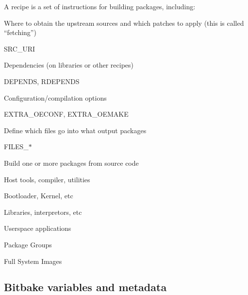 \begin{DoxyItemize}
\item A recipe is a set of instructions for building packages, including\+:
\begin{DoxyItemize}
\item Where to obtain the upstream sources and which patches to apply (this is called “fetching”)
\begin{DoxyItemize}
\item S\+R\+C\+\_\+\+U\+RI
\end{DoxyItemize}
\item Dependencies (on libraries or other recipes)
\begin{DoxyItemize}
\item D\+E\+P\+E\+N\+DS, R\+D\+E\+P\+E\+N\+DS
\end{DoxyItemize}
\item Configuration/compilation options
\begin{DoxyItemize}
\item E\+X\+T\+R\+A\+\_\+\+O\+E\+C\+O\+NF, E\+X\+T\+R\+A\+\_\+\+O\+E\+M\+A\+KE
\end{DoxyItemize}
\item Define which files go into what output packages
\begin{DoxyItemize}
\item F\+I\+L\+E\+S\+\_\+$\ast$
\end{DoxyItemize}
\end{DoxyItemize}
\item Build one or more packages from source code
\begin{DoxyItemize}
\item Host tools, compiler, utilities
\item Bootloader, Kernel, etc
\item Libraries, interpretors, etc
\item Userspace applications
\end{DoxyItemize}
\item Package Groups
\item Full System Images
\end{DoxyItemize}

\subsection*{Bitbake variables and metadata}


